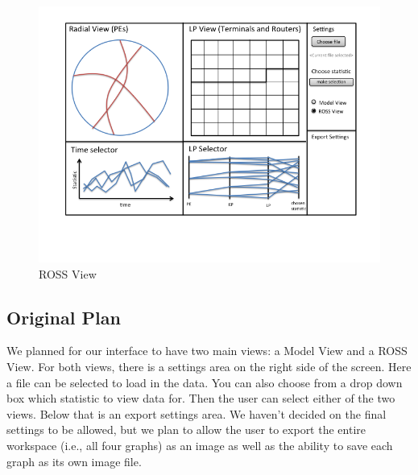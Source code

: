 \documentclass{acm_proc_article-sp}
\begin{document}
\begin{figure}[t]
\centering
   \includegraphics[width=5.0in, clip=true, trim=0 1in 0 0]{../../figures/gui-diagram/Slide2.png}
\caption{ROSS View}
\label{ross-view}
\end{figure}
\subsection{Original Plan}
We planned for our interface to have two main views: a Model View and a ROSS View.  For both views, there is a settings area on the right side of the screen.  Here a file can be selected to load in the data.  You can also choose from a drop down box which statistic to view data for.  Then the user can select either of the two views.  Below that is an export settings area.  We haven't decided on the final settings to be allowed, but we plan to allow the user to export the entire workspace (i.e., all four graphs) as an image as well as the ability to save each graph as its own image file.  
\end{document}
